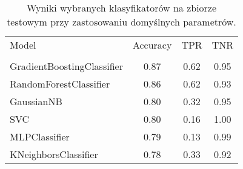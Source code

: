 \begin{table}[t]
\centering
\caption{Wyniki wybranych klasyfikatorów na zbiorze testowym przy zastosowaniu domyślnych parametrów.}
\label{tab:base-results}
\begin{tabular}{lccc}
\toprule
Model & Accuracy & TPR & TNR \\
 &  &  &  \\
\midrule
GradientBoostingClassifier & 0.87 & 0.62 & 0.95 \\
RandomForestClassifier & 0.86 & 0.62 & 0.93 \\
GaussianNB & 0.80 & 0.32 & 0.95 \\
SVC & 0.80 & 0.16 & 1.00 \\
MLPClassifier & 0.79 & 0.13 & 0.99 \\
KNeighborsClassifier & 0.78 & 0.33 & 0.92 \\
\bottomrule
\end{tabular}
\end{table}
